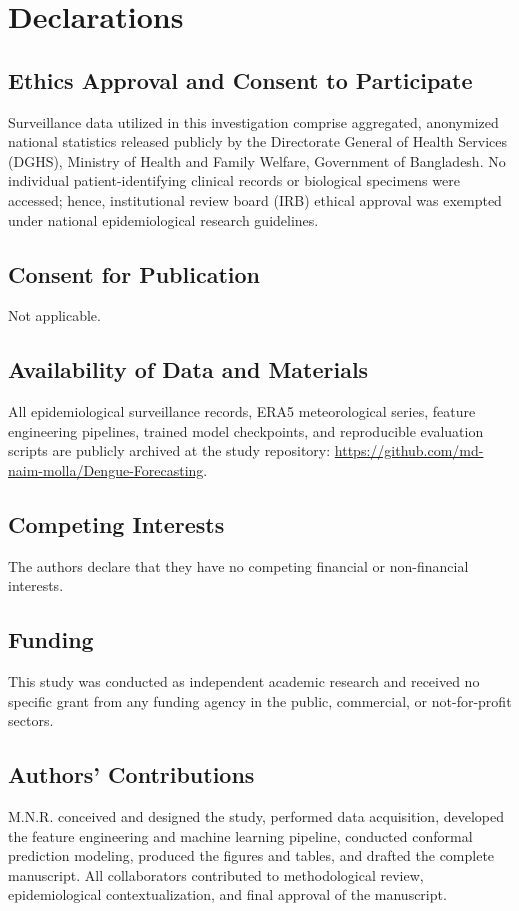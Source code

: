 \documentclass[11pt,a4paper]{article}
\begin{document}
\section*{Declarations}

\subsection*{Ethics Approval and Consent to Participate}
Surveillance data utilized in this investigation comprise aggregated, anonymized national statistics released publicly by the Directorate General of Health Services (DGHS), Ministry of Health and Family Welfare, Government of Bangladesh. No individual patient-identifying clinical records or biological specimens were accessed; hence, institutional review board (IRB) ethical approval was exempted under national epidemiological research guidelines.

\subsection*{Consent for Publication}
Not applicable.

\subsection*{Availability of Data and Materials}
All epidemiological surveillance records, ERA5 meteorological series, feature engineering pipelines, trained model checkpoints, and reproducible evaluation scripts are publicly archived at the study repository: \url{https://github.com/md-naim-molla/Dengue-Forecasting}.

\subsection*{Competing Interests}
The authors declare that they have no competing financial or non-financial interests.

\subsection*{Funding}
This study was conducted as independent academic research and received no specific grant from any funding agency in the public, commercial, or not-for-profit sectors.

\subsection*{Authors' Contributions}
M.N.R. conceived and designed the study, performed data acquisition, developed the feature engineering and machine learning pipeline, conducted conformal prediction modeling, produced the figures and tables, and drafted the complete manuscript. All collaborators contributed to methodological review, epidemiological contextualization, and final approval of the manuscript.



\end{document}
